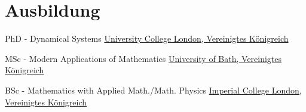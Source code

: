 \documentclass[german, print]{cv-style-wide-de}
\begin{document}
\section{Ausbildung}%
\begin{entrylist}
%
{PhD \hspace{\diffpwidth/2}-\hspace{\diffpwidth/2} Dynamical Systems}%
{%
\href{https://ucl.ac.uk}{University College London, Vereinigtes Königreich}%
}%
{}%


%
{MSc - Modern Applications of Mathematics}%
{%
\href{https://bath.ac.uk}{University of Bath, Vereinigtes Königreich}%
}%
{}%

%
{BSc \hspace{\diffbwidth/2}-\hspace{\diffbwidth/2} Mathematics with Applied Math./Math. Physics}%
{%
\href{https://imperial.ac.uk}{Imperial College London, Vereinigtes Königreich}%
}%
{}%

\end{entrylist}



\newpage
\end{document}
